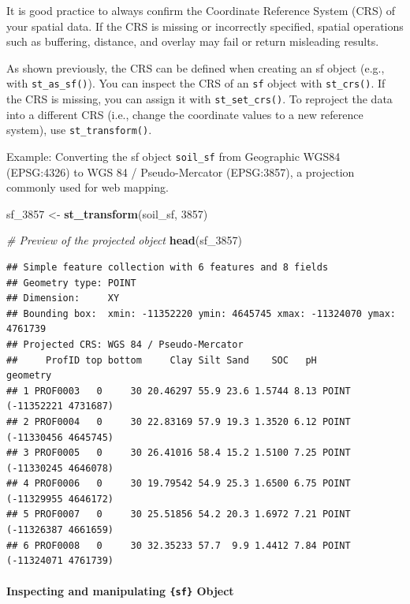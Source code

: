\documentclass[
  10pt,
  b5paper,
  oneside]{book}
\newenvironment{Shaded}{\begin{snugshade}}{\end{snugshade}}
\newcommand{\CommentTok}[1]{\textcolor[rgb]{0.56,0.35,0.01}{\textit{#1}}}
\newcommand{\DecValTok}[1]{\textcolor[rgb]{0.00,0.00,0.81}{#1}}
\newcommand{\FunctionTok}[1]{\textcolor[rgb]{0.13,0.29,0.53}{\textbf{#1}}}
\newcommand{\NormalTok}[1]{#1}
\newcommand{\OtherTok}[1]{\textcolor[rgb]{0.56,0.35,0.01}{#1}}
\begin{document}
It is good practice to always confirm the Coordinate Reference System (CRS) of your spatial data. If the CRS is missing or incorrectly specified, spatial operations such as buffering, distance, and overlay may fail or return misleading results.

As shown previously, the CRS can be defined when creating an sf object (e.g., with \texttt{st\_as\_sf()}). You can inspect the CRS of an \texttt{sf} object with \texttt{st\_crs()}. If the CRS is missing, you can assign it with \texttt{st\_set\_crs()}. To reproject the data into a different CRS (i.e., change the coordinate values to a new reference system), use \texttt{st\_transform()}.

Example: Converting the sf object \texttt{soil\_sf} from Geographic WGS84 (EPSG:4326) to WGS 84 / Pseudo-Mercator (EPSG:3857), a projection commonly used for web mapping.

\begin{Shaded}
\begin{Highlighting}[]
\NormalTok{sf\_3857 }\OtherTok{\textless{}{-}} \FunctionTok{st\_transform}\NormalTok{(soil\_sf, }\DecValTok{3857}\NormalTok{)}

\CommentTok{\# Preview of the projected object}
\FunctionTok{head}\NormalTok{(sf\_3857)}
\end{Highlighting}
\end{Shaded}

\begin{verbatim}
## Simple feature collection with 6 features and 8 fields
## Geometry type: POINT
## Dimension:     XY
## Bounding box:  xmin: -11352220 ymin: 4645745 xmax: -11324070 ymax: 4761739
## Projected CRS: WGS 84 / Pseudo-Mercator
##     ProfID top bottom     Clay Silt Sand    SOC   pH                  geometry
## 1 PROF0003   0     30 20.46297 55.9 23.6 1.5744 8.13 POINT (-11352221 4731687)
## 2 PROF0004   0     30 22.83169 57.9 19.3 1.3520 6.12 POINT (-11330456 4645745)
## 3 PROF0005   0     30 26.41016 58.4 15.2 1.5100 7.25 POINT (-11330245 4646078)
## 4 PROF0006   0     30 19.79542 54.9 25.3 1.6500 6.75 POINT (-11329955 4646172)
## 5 PROF0007   0     30 25.51856 54.2 20.3 1.6972 7.21 POINT (-11326387 4661659)
## 6 PROF0008   0     30 32.35233 57.7  9.9 1.4412 7.84 POINT (-11324071 4761739)
\end{verbatim}

\paragraph*{\texorpdfstring{Inspecting and manipulating \texttt{\{sf\}} Object}{Inspecting and manipulating \{sf\} Object}}\label{inspecting-and-manipulating-sf-object}
\end{document}
